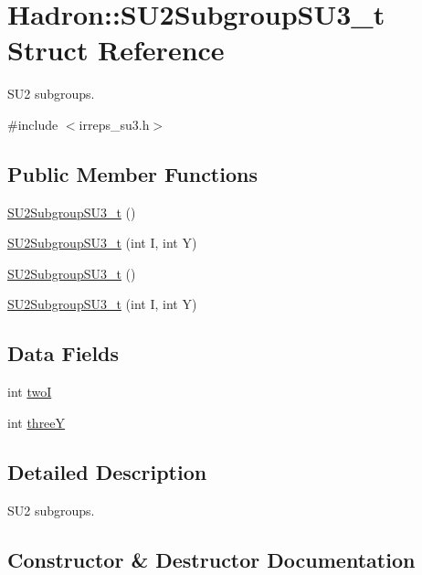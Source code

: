 \hypertarget{structHadron_1_1SU2SubgroupSU3__t}{}\section{Hadron\+:\+:S\+U2\+Subgroup\+S\+U3\+\_\+t Struct Reference}
\label{structHadron_1_1SU2SubgroupSU3__t}


S\+U2 subgroups.  




{\ttfamily \#include $<$irreps\+\_\+su3.\+h$>$}

\subsection*{Public Member Functions}
\begin{DoxyCompactItemize}
\item 
\mbox{\hyperlink{structHadron_1_1SU2SubgroupSU3__t_aebd2bbbecf62f223ec0efa5a4954e7ba}{S\+U2\+Subgroup\+S\+U3\+\_\+t}} ()
\item 
\mbox{\hyperlink{structHadron_1_1SU2SubgroupSU3__t_a26fbf2f4603e560c703931e13d5e0af5}{S\+U2\+Subgroup\+S\+U3\+\_\+t}} (int I, int Y)
\item 
\mbox{\hyperlink{structHadron_1_1SU2SubgroupSU3__t_aebd2bbbecf62f223ec0efa5a4954e7ba}{S\+U2\+Subgroup\+S\+U3\+\_\+t}} ()
\item 
\mbox{\hyperlink{structHadron_1_1SU2SubgroupSU3__t_a26fbf2f4603e560c703931e13d5e0af5}{S\+U2\+Subgroup\+S\+U3\+\_\+t}} (int I, int Y)
\end{DoxyCompactItemize}
\subsection*{Data Fields}
\begin{DoxyCompactItemize}
\item 
int \mbox{\hyperlink{structHadron_1_1SU2SubgroupSU3__t_a545b54ec733cee39969e152dd9b18c3f}{twoI}}
\item 
int \mbox{\hyperlink{structHadron_1_1SU2SubgroupSU3__t_aee956c5cda78da686316083413d70bec}{threeY}}
\end{DoxyCompactItemize}


\subsection{Detailed Description}
S\+U2 subgroups. 

\subsection{Constructor \& Destructor Documentation}
\mbox{\label{structHadron_1_1SU2SubgroupSU3__t_aebd2bbbecf62f223ec0efa5a4954e7ba}} 
